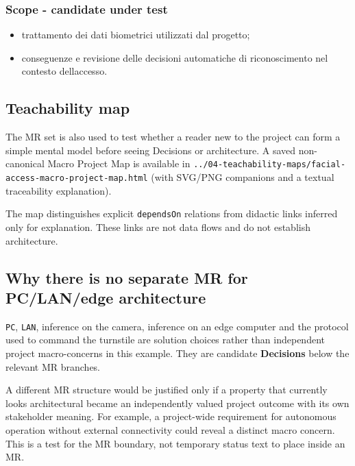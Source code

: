 \documentclass[
  10pt,
]{article}
\providecommand{\tightlist}{%
  \setlength{\itemsep}{0pt}\setlength{\parskip}{0pt}}
\begin{document}
\subsubsection{Scope - candidate under
test}\label{scope---candidate-under-test-3}

\begin{itemize}
\tightlist
\item
  trattamento dei dati biometrici utilizzati dal progetto;
\item
  conseguenze e revisione delle decisioni automatiche di riconoscimento
  nel contesto dell\textquotesingle accesso.
\end{itemize}

\subsection{Teachability map}\label{teachability-map}

The MR set is also used to test whether a reader new to the project can
form a simple mental model before seeing Decisions or architecture. A
saved non-canonical Macro Project Map is available in
\texttt{../04-teachability-maps/facial-access-macro-project-map.html}
(with SVG/PNG companions and a textual traceability explanation).

The map distinguishes explicit \texttt{dependsOn} relations from
didactic links inferred only for explanation. These links are not data
flows and do not establish architecture.

\subsection{Why there is no separate MR for PC/LAN/edge
architecture}\label{why-there-is-no-separate-mr-for-pclanedge-architecture}

\texttt{PC}, \texttt{LAN}, inference on the camera, inference on an edge
computer and the protocol used to command the turnstile are solution
choices rather than independent project macro-concerns in this example.
They are candidate \textbf{Decisions} below the relevant MR branches.

A different MR structure would be justified only if a property that
currently looks architectural became an independently valued project
outcome with its own stakeholder meaning. For example, a project-wide
requirement for autonomous operation without external connectivity could
reveal a distinct macro concern. This is a test for the MR boundary, not
temporary status text to place inside an MR.
\end{document}
